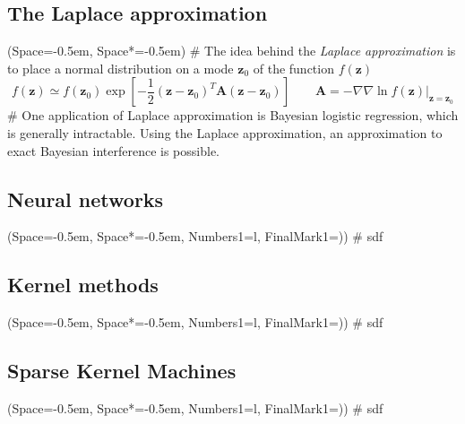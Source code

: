 \documentclass[12pt, a4paper]{article}
\newcommand{\listSpace}{-0.5em}%
\newcommand{\vect}[1]{\bm{#1}}
\begin{document}
\subsection*{The Laplace approximation}
\begin{easylist}[itemize]
	\ListProperties(Space=\listSpace, Space*=\listSpace)
	# The idea behind the \emph{Laplace approximation} is to place a normal distribution on a mode $\vect{z}_0$ of the function $f(\vect{z})$
	\begin{equation*}
		f(\vect{z}) \simeq f(\vect{z}_0) \exp \left[ 
		- \frac{1}{2}
		(\vect{z} - \vect{z}_0)^T \vect{A}
		(\vect{z} - \vect{z}_0)
		 \right]
		 \qquad
		 \vect{A} = \left. - \nabla \nabla \ln f(\vect{z}) \right|_{\vect{z} = \vect{z}_0}
	\end{equation*}
	# One application of Laplace approximation is Bayesian logistic regression, which is generally intractable.
	Using the Laplace approximation, an approximation to exact Bayesian interference is possible.
\end{easylist}

\subsection{Neural networks}
\begin{easylist}[itemize]
	\ListProperties(Space=\listSpace, Space*=\listSpace, Numbers1=l, FinalMark1={)})
	# sdf
\end{easylist}

\subsection{Kernel methods}
\begin{easylist}[itemize]
	\ListProperties(Space=\listSpace, Space*=\listSpace, Numbers1=l, FinalMark1={)})
	# sdf
\end{easylist}

\subsection{Sparse Kernel Machines}
\begin{easylist}[itemize]
	\ListProperties(Space=\listSpace, Space*=\listSpace, Numbers1=l, FinalMark1={)})
	# sdf
\end{easylist}
\end{document}
